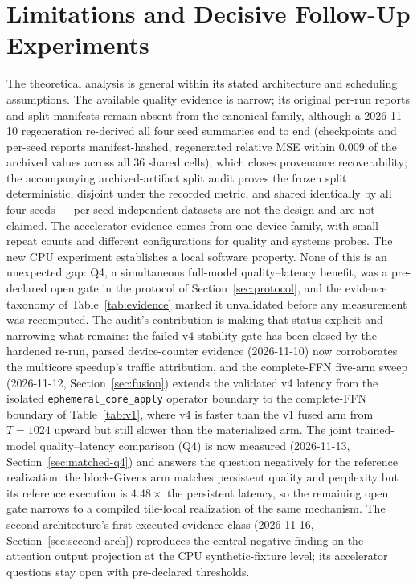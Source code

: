 \section{Limitations and Decisive Follow-Up Experiments}\label{sec:limitations}
The theoretical analysis is general within its stated architecture and
scheduling assumptions. The available quality evidence is narrow; its
original per-run reports and split manifests remain absent from the
canonical family, although a 2026-11-10 regeneration re-derived all four
seed summaries end to end (checkpoints and per-seed reports
manifest-hashed, regenerated relative MSE within $0.009$ of the archived
values across all 36 shared cells), which closes provenance
recoverability; the accompanying archived-artifact split audit proves the
frozen split deterministic, disjoint under the recorded metric, and shared
identically by all four seeds --- per-seed independent datasets are not the
design and are not claimed. The
accelerator evidence comes from one device
family, with small repeat counts and different configurations for quality and
systems probes. The new CPU experiment establishes a local software property.
None of this is an unexpected gap: Q4, a simultaneous full-model
quality--latency benefit, was a pre-declared open gate in the protocol of
Section~\ref{sec:protocol}, and the evidence taxonomy of
Table~\ref{tab:evidence} marked it unvalidated before any measurement was
recomputed. The audit's contribution is making that status explicit and
narrowing what remains: the failed v4 stability gate has been closed by the
hardened re-run, parsed device-counter evidence (2026-11-10) now
corroborates the multicore speedup's traffic attribution, and the
complete-FFN five-arm sweep (2026-11-12,
Section~\ref{sec:fusion}) extends the validated v4 latency from the
isolated \texttt{ephemeral\_core\_apply} operator boundary to the
complete-FFN boundary of Table~\ref{tab:v1}, where v4 is faster than
the v1 fused arm from $T{=}1024$ upward but still slower than the
materialized arm. The joint trained-model quality--latency comparison
(Q4) is now measured (2026-11-13,
Section~\ref{sec:matched-q4}) and answers the question negatively for
the reference realization: the block-Givens arm matches persistent
quality and perplexity but its reference execution is $4.48\times$ the
persistent latency, so the remaining open gate narrows to a compiled
tile-local realization of the same mechanism. The second architecture's
first executed evidence class (2026-11-16,
Section~\ref{sec:second-arch}) reproduces the central negative finding
on the attention output projection at the CPU synthetic-fixture level;
its accelerator questions stay open with pre-declared thresholds.

